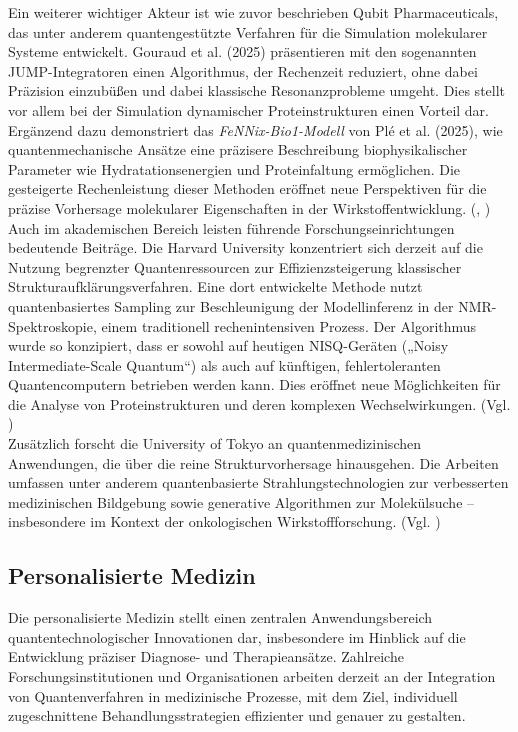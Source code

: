 Ein weiterer wichtiger Akteur ist wie zuvor beschrieben Qubit Pharmaceuticals, das unter anderem quantengestützte Verfahren für die Simulation molekularer Systeme entwickelt. Gouraud et al. (2025) präsentieren mit den sogenannten JUMP-Integratoren einen Algorithmus, der Rechenzeit reduziert, ohne dabei Präzision einzubüßen und dabei klassische Resonanzprobleme umgeht. Dies stellt vor allem bei der Simulation dynamischer Proteinstrukturen einen Vorteil dar. Ergänzend dazu demonstriert das \textit{FeNNix-Bio1-Modell} von Plé et al. (2025), wie quantenmechanische Ansätze eine präzisere Beschreibung biophysikalischer Parameter wie Hydratationsenergien und Proteinfaltung ermöglichen. Die gesteigerte Rechenleistung dieser Methoden eröffnet neue Perspektiven für die präzise Vorhersage molekularer Eigenschaften in der Wirkstoffentwicklung. (\cite{gouraud_velocity_2025}, \cite{ple_foundation_2025})\\

Auch im akademischen Bereich leisten führende Forschungseinrichtungen bedeutende Beiträge. Die Harvard University konzentriert sich derzeit auf die Nutzung begrenzter Quantenressourcen zur Effizienzsteigerung klassischer Strukturaufklärungsverfahren. Eine dort entwickelte Methode nutzt quantenbasiertes Sampling zur Beschleunigung der Modellinferenz in der NMR-Spektroskopie, einem traditionell rechenintensiven Prozess. Der Algorithmus wurde so konzipiert, dass er sowohl auf heutigen NISQ-Geräten („Noisy Intermediate-Scale Quantum“) als auch auf künftigen, fehlertoleranten Quantencomputern betrieben werden kann. Dies eröffnet neue Möglichkeiten für die Analyse von Proteinstrukturen und deren komplexen Wechselwirkungen. (Vgl. \cite{sels_quantum_2020})\\

Zusätzlich forscht die University of Tokyo an quantenmedizinischen Anwendungen, die über die reine Strukturvorhersage hinausgehen. Die Arbeiten umfassen unter anderem quantenbasierte Strahlungstechnologien zur verbesserten medizinischen Bildgebung sowie generative Algorithmen zur Molekülsuche – insbesondere im Kontext der onkologischen Wirkstoffforschung. (Vgl. \cite{shimazoe_development_2020})


\subsection*{Personalisierte Medizin}

Die personalisierte Medizin stellt einen zentralen Anwendungsbereich quantentechnologischer Innovationen dar, insbesondere im Hinblick auf die Entwicklung präziser Diagnose- und Therapieansätze. Zahlreiche Forschungsinstitutionen und Organisationen arbeiten derzeit an der Integration von Quantenverfahren in medizinische Prozesse, mit dem Ziel, individuell zugeschnittene Behandlungsstrategien effizienter und genauer zu gestalten.\\

